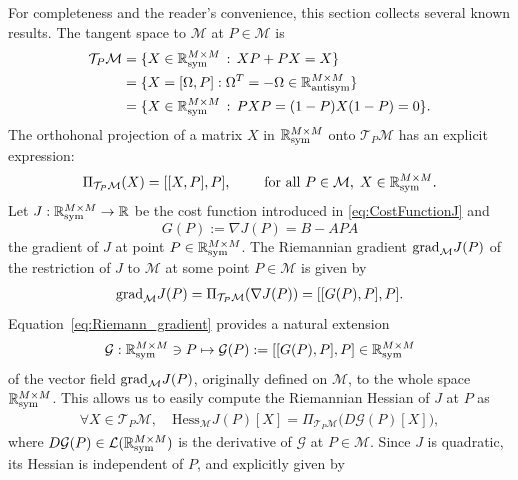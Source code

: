 \documentclass{article}
\def\R{\mathbb R}
\newcommand{\1}{{\mathds 1}}
\begin{document}
For completeness and the reader's convenience, this section collects several known results.
The tangent space to $\mathcal M$ at $P\in\mathcal M$ is
\begin{align}
  \mathcal T_P \mathcal M
&= \{ X\in\mathbb R^{M\times M}_{\mathrm{sym}} \,:\, XP + PX = X \} \nonumber \\
&= \{ X = [\Omega, P] : \Omega^T = -\Omega \in \R^{M \times M}_{\rm antisym} \} \nonumber \\
&=  \{ X\in\mathbb R^{M\times M}_{\mathrm{sym}} \,:\, PXP =(1-P)X(1-P) = 0 \} . \label{eq:tangent_space_def}
\end{align}    
The orthohonal projection of a matrix $X$ in $\mathbb{R}_{\rm sym}^{M\times M}$ onto $\mathcal{T}_{P}\mathcal{M}$ has an explicit expression:
    \begin{equation}
    \label{projector_tangent}
        \Pi_{\mathcal{T}_{P}\mathcal M}(X) = [[X,P], P], \qquad \mbox{ for all } P \in \mathcal M, \; X \in \mathbb{R}_{\rm sym}^{M\times M}.
    \end{equation}  
Let $J : \R^{M \times M}_{\rm sym} \to \R$ be the cost function introduced in \eqref{eq:CostFunctionJ} and 
\begin{equation}
\label{eq:gradient}
    G(P):=\nabla J(P)= B-AP A
\end{equation}
the gradient of $J$ at point $P \in \R^{M \times M}_{\rm sym}$. The Riemannian gradient ${\rm grad}_{\mathcal M}J(P)$ of the restriction of $J$ to $\mathcal M$ at some point $P \in \mathcal M$ is given by
\begin{align}
    \label{eq:Riemann_gradient}
 {\rm grad}_{\mathcal M}J(P)= \Pi_{\mathcal{T}_{P}\mathcal M}(\nabla J(P)) = [[G(P),P],P].   
\end{align}
Equation~\eqref{eq:Riemann_gradient} provides a natural extension 
$$
\mathcal G : \R^{M \times M}_{\rm sym} \ni P \mapsto \mathcal G(P):=[[G(P),P],P] \in  \R^{M \times M}_{\rm sym}
$$
of the vector field ${\rm grad}_{\mathcal M}J(P)$, originally defined on $\mathcal M$, to the whole space $\R^{M \times M}_{\rm sym}$.
This allows us to easily compute the Riemannian Hessian of $J$ at $P$ as 
\begin{align}\label{eq:Hessian}
\forall X \in \mathcal{T}_{P}\mathcal{M}, \quad \mbox{Hess}_{\mathcal{M}} J(P)[X] = \Pi_{\mathcal{T}_P\mathcal{M}} \big(D\mathcal G(P)[X]\big),    
\end{align}
where $D\mathcal G(P) \in \mathcal L(\R^{M \times M}_{\rm sym})$ is the derivative of $\mathcal G$ at $P \in \mathcal M$. 
Since $J$ is quadratic, its Hessian is independent of $P$, and explicitly given by
\end{document}
